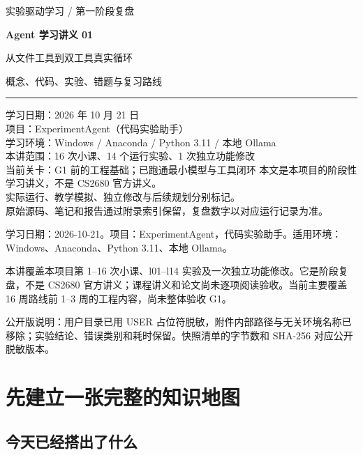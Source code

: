 \documentclass[UTF8,zihao=-4,fontset=fandol]{ctexart}
\begin{document}
\hypersetup{pageanchor=false}
\begin{titlepage}
\vspace*{14mm}
{\large\color{Accent}实验驱动学习 / 第一阶段复盘\par}
\vspace{10mm}
{\Huge\bfseries\color{Ink}Agent 学习讲义 01\par}
\vspace{6mm}
{\LARGE 从文件工具到双工具真实循环\par}
\vspace{12mm}
{\large 概念、代码、实验、错题与复习路线\par}
\vspace{14mm}
\hrule
\vspace{6mm}
学习日期：2026 年 10 月 21 日\\
项目：ExperimentAgent（代码实验助手）\\
学习环境：Windows / Anaconda / Python 3.11 / 本地 Ollama\\
本讲范围：16 次小课、14 个运行实验、1 次独立功能修改\\
当前关卡：G1 前的工程基础；已跑通最小模型与工具闭环
\vfill
\small
本文是本项目的阶段性学习讲义，不是 CS2680 官方讲义。\\
实际运行、教学模拟、独立修改与后续规划分别标记。\\
原始源码、笔记和报告通过附录索引保留，复盘数字以对应运行记录为准。
\end{titlepage}
\hypersetup{pageanchor=true}
\tableofcontents
\clearpage
{}

学习日期：2026-10-21。项目：ExperimentAgent，代码实验助手。适用环境：Windows、Anaconda、Python 3.11、本地 Ollama。

本讲覆盖本项目第 1–16 次小课、l01–l14 实验及一次独立功能修改。它是阶段复盘，不是 CS2680 官方讲义；课程讲义和论文尚未逐项阅读验收。当前主要覆盖 16 周路线前 1–3 周的工程内容，尚未整体验收 G1。

公开版说明：用户目录已用 USER 占位符脱敏，附件内部路径与无关环境名称已移除；实验结论、错误类别和耗时保留。快照清单的字节数和 SHA-256 对应公开脱敏版本。

\section{先建立一张完整的知识地图}

\subsection{今天已经搭出了什么}
\end{document}
